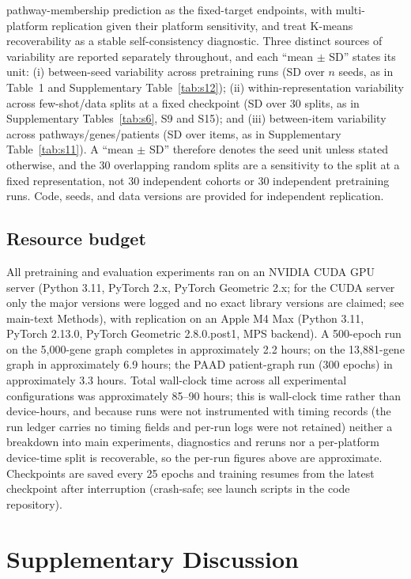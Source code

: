 \documentclass[11pt,a4paper]{article}
\newcommand{\supptab}[1]{Supplementary Table~\ref{#1}}
\newcommand{\supptabs}[1]{Supplementary Tables~\ref{#1}}
\begin{document}
pathway-membership prediction as the fixed-target endpoints, with multi-platform replication given their platform sensitivity, and treat K-means recoverability as a stable self-consistency diagnostic. Three distinct sources of variability are reported separately throughout, and each ``mean $\pm$ SD'' states its unit: (i) between-seed variability across pretraining runs (SD over $n$ seeds, as in Table~1 and \supptab{tab:s12}); (ii) within-representation variability across few-shot/data splits at a fixed checkpoint (SD over 30 splits, as in \supptabs{tab:s6}, S9 and S15); and (iii) between-item variability across pathways/genes/patients (SD over items, as in \supptab{tab:s11}). A ``mean $\pm$ SD'' therefore denotes the seed unit unless stated otherwise, and the 30 overlapping random splits are a sensitivity to the split at a fixed representation, not 30 independent cohorts or 30 independent pretraining runs. Code, seeds, and data versions are provided for independent replication.


\subsection{Resource budget}

All pretraining and evaluation experiments ran on an NVIDIA CUDA GPU server (Python 3.11, PyTorch 2.x, PyTorch Geometric 2.x; for the CUDA server only the major versions were logged and no exact library versions are claimed; see main-text Methods), with replication on an Apple M4 Max (Python 3.11, PyTorch 2.13.0, PyTorch Geometric 2.8.0.post1, MPS backend). A 500-epoch run on the 5,000-gene graph completes in approximately 2.2 hours; on the 13,881-gene graph in approximately 6.9 hours; the PAAD patient-graph run (300 epochs) in approximately 3.3 hours. Total wall-clock time across all experimental configurations was approximately 85--90 hours; this is wall-clock time rather than device-hours, and because runs were not instrumented with timing records (the run ledger carries no timing fields and per-run logs were not retained) neither a breakdown into main experiments, diagnostics and reruns nor a per-platform device-time split is recoverable, so the per-run figures above are approximate. Checkpoints are saved every 25 epochs and training resumes from the latest checkpoint after interruption (crash-safe; see launch scripts in the code repository).
\FloatBarrier


\section{Supplementary Discussion}
\end{document}
